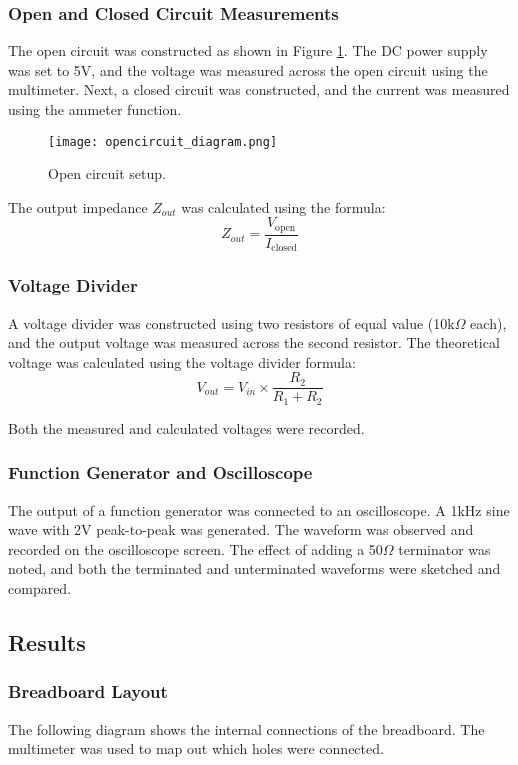 \documentclass{article}
\begin{document}
\subsubsection{Open and Closed Circuit Measurements}
The open circuit was constructed as shown in Figure \ref{fig:opencircuit}. The DC power supply was set to 5V, and the voltage was measured across the open circuit using the multimeter. Next, a closed circuit was constructed, and the current was measured using the ammeter function.

\begin{figure}[H]
    \centering
    \texttt{[image: opencircuit\_diagram.png]} %
    \caption{Open circuit setup.}
    \label{fig:opencircuit}
\end{figure}

The output impedance $Z_{out}$ was calculated using the formula:
\[
Z_{out} = \frac{V_{\text{open}}}{I_{\text{closed}}}
\]

\subsubsection{Voltage Divider}
A voltage divider was constructed using two resistors of equal value (10k$\Omega$ each), and the output voltage was measured across the second resistor. The theoretical voltage was calculated using the voltage divider formula:
\[
V_{out} = V_{in} \times \frac{R_2}{R_1 + R_2}
\]

Both the measured and calculated voltages were recorded.

\subsubsection{Function Generator and Oscilloscope}
The output of a function generator was connected to an oscilloscope. A 1kHz sine wave with 2V peak-to-peak was generated. The waveform was observed and recorded on the oscilloscope screen. The effect of adding a 50$\Omega$ terminator was noted, and both the terminated and unterminated waveforms were sketched and compared.

\subsection{Results}
\subsubsection{Breadboard Layout}
The following diagram shows the internal connections of the breadboard. The multimeter was used to map out which holes were connected.
\end{document}
